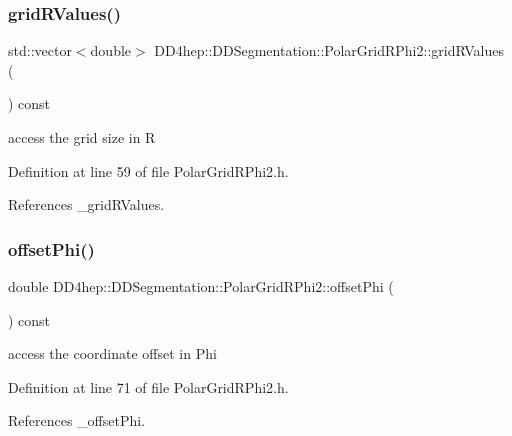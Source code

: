 \subsubsection{\texorpdfstring{grid\+R\+Values()}{gridRValues()}}
{\footnotesize\ttfamily std\+::vector$<$double$>$ D\+D4hep\+::\+D\+D\+Segmentation\+::\+Polar\+Grid\+R\+Phi2\+::grid\+R\+Values (\begin{DoxyParamCaption}{ }\end{DoxyParamCaption}) const\hspace{0.3cm}{\ttfamily [inline]}}



access the grid size in R 



Definition at line 59 of file Polar\+Grid\+R\+Phi2.\+h.



References \+\_\+grid\+R\+Values.

\hypertarget{class_d_d4hep_1_1_d_d_segmentation_1_1_polar_grid_r_phi2_ae815cf507d7596b69c44561ade2121c7}{}\label{class_d_d4hep_1_1_d_d_segmentation_1_1_polar_grid_r_phi2_ae815cf507d7596b69c44561ade2121c7} 
\subsubsection{\texorpdfstring{offset\+Phi()}{offsetPhi()}}
{\footnotesize\ttfamily double D\+D4hep\+::\+D\+D\+Segmentation\+::\+Polar\+Grid\+R\+Phi2\+::offset\+Phi (\begin{DoxyParamCaption}{ }\end{DoxyParamCaption}) const\hspace{0.3cm}{\ttfamily [inline]}}



access the coordinate offset in Phi 



Definition at line 71 of file Polar\+Grid\+R\+Phi2.\+h.



References \+\_\+offset\+Phi.

\hypertarget{class_d_d4hep_1_1_d_d_segmentation_1_1_polar_grid_r_phi2_a7b684077d95e9e6a37db23ff19239236}{}\label{class_d_d4hep_1_1_d_d_segmentation_1_1_polar_grid_r_phi2_a7b684077d95e9e6a37db23ff19239236} 
